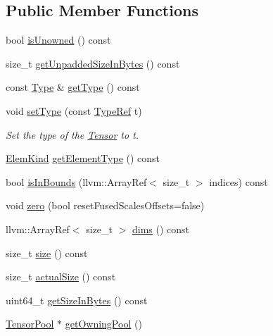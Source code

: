 \subsection*{Public Member Functions}
\begin{DoxyCompactItemize}
\item 
bool \hyperlink{classglow_1_1_tensor_a574b58e799067a444cb639d0e7791b47}{is\+Unowned} () const
\item 
size\+\_\+t \hyperlink{classglow_1_1_tensor_a785ff21009c869e55c614a740c14de6f}{get\+Unpadded\+Size\+In\+Bytes} () const
\item 
const \hyperlink{structglow_1_1_type}{Type} \& \hyperlink{classglow_1_1_tensor_aeb7622d21d76d06f4628386c9a2db733}{get\+Type} () const
\item 
\mbox{\label{classglow_1_1_tensor_a88806a5ba8a0bbb9abff000f6b27d3b6}} 
void \hyperlink{classglow_1_1_tensor_a88806a5ba8a0bbb9abff000f6b27d3b6}{set\+Type} (const \hyperlink{structglow_1_1_type}{Type\+Ref} t)
\begin{DoxyCompactList}\small\item\em Set the type of the \hyperlink{classglow_1_1_tensor}{Tensor} to {\ttfamily t}. \end{DoxyCompactList}\item 
\hyperlink{namespaceglow_ab92e14a94329daf4083db670e95fbcdf}{Elem\+Kind} \hyperlink{classglow_1_1_tensor_affaeb77d2037ea76e6deea21a13c39dc}{get\+Element\+Type} () const
\item 
bool \hyperlink{classglow_1_1_tensor_ac6a74e37ff3771b581afc94291899f20}{is\+In\+Bounds} (llvm\+::\+Array\+Ref$<$ size\+\_\+t $>$ indices) const
\item 
void \hyperlink{classglow_1_1_tensor_ab55a3efa21c06448d41b445520aaef42}{zero} (bool reset\+Fused\+Scales\+Offsets=false)
\item 
llvm\+::\+Array\+Ref$<$ size\+\_\+t $>$ \hyperlink{classglow_1_1_tensor_ad299b107d8ed92bb55392c4cb97070d9}{dims} () const
\item 
size\+\_\+t \hyperlink{classglow_1_1_tensor_a131eef055527823adf306e8928d4ae04}{size} () const
\item 
size\+\_\+t \hyperlink{classglow_1_1_tensor_a72f7219f5e4e926d953fd1dc674ff7c0}{actual\+Size} () const
\item 
uint64\+\_\+t \hyperlink{classglow_1_1_tensor_a5ef091fe78b378595f2ce3adf32b1821}{get\+Size\+In\+Bytes} () const
\item 
\hyperlink{classglow_1_1_tensor_pool}{Tensor\+Pool} $\ast$ \hyperlink{classglow_1_1_tensor_a62651514d8a45c6633948a87a1766e56}{get\+Owning\+Pool} ()

\end{DoxyCompactItemize}
